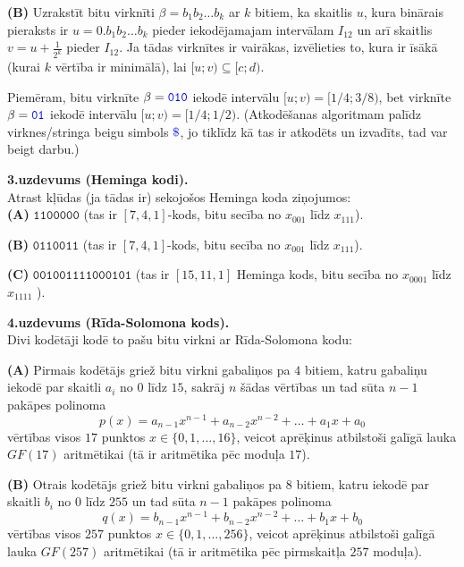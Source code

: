 \documentclass[a4paper]{article}
\begin{document}
\vspace{5pt}
{\bf (B)} Uzrakstīt bitu virknīti $\beta = b_1b_2\ldots{}b_k$ ar $k$ bitiem, ka 
skaitlis $u$, kura binārais pieraksts ir $u = 0.b_1b_2\ldots{}b_k$ pieder iekodējamajam intervālam 
$I_{12}$ un arī skaitlis $v = u + \frac{1}{2^k}$ pieder $I_{12}$. Ja tādas virknītes ir 
vairākas, izvēlieties to, kura ir īsākā (kurai $k$ vērtība ir minimālā), lai $[u;v) \subseteq [c;d)$. 

\vspace{5pt}
Piemēram, bitu virknīte $\beta = \textcolor{blue}{\mathtt{010}}$ iekodē intervālu $[u;v) = [1/4;3/8)$, 
bet virknīte $\beta = \textcolor{blue}{\mathtt{01}}$ iekodē intervālu $[u;v) = [1/4; 1/2)$. 
(Atkodēšanas algoritmam palīdz virknes/stringa beigu simbols $\textcolor{blue}{\mathtt{\$}}$, jo 
tiklīdz kā tas ir atkodēts un izvadīts, tad var beigt darbu.)


\vspace{20pt}
{\bf 3.uzdevums (Heminga kodi).}\\
Atrast kļūdas (ja tādas ir) sekojošos Heminga koda ziņojumos:\\
{\bf (A)} $\mathtt{1100000}$ (tas ir $[7,4,1]$-kods, bitu secība no $x_{001}$ līdz $x_{111}$). 

\vspace{5pt}
{\bf (B)} $\mathtt{0110011}$ (tas ir $[7,4,1]$-kods, bitu secība no $x_{001}$ līdz $x_{111}$). 

\vspace{5pt}
{\bf (C)} $\mathtt{001001111000101}$ (tas ir $[15,11,1]$ Heminga kods, bitu secība \textendash{} no $x_{0001}$ līdz
$x_{1111}$ ).



\vspace{20pt}
{\bf 4.uzdevums (Rīda-Solomona kods).}\\
Divi kodētāji kodē to pašu bitu virkni ar Rīda-Solomona kodu:

\vspace{5pt}
{\bf (A)} Pirmais kodētājs griež bitu virkni 
gabaliņos pa $4$ bitiem, katru gabaliņu iekodē par skaitli $a_i$ no $0$ līdz $15$, sakrāj $n$ šādas vērtības 
un tad sūta $n-1$ pakāpes polinoma 
$$p(x) = a_{n-1}x^{n-1} + a_{n-2}x^{n-2} + \ldots + a_1x + a_0$$
vērtības visos $17$ punktos $x \in \{ 0,1,\ldots,16 \}$, veicot aprēķinus atbilstoši galīgā lauka $GF(17)$ 
aritmētikai (tā ir aritmētika pēc moduļa $17$).

\vspace{5pt}
{\bf (B)} Otrais kodētājs griež bitu virkni gabaliņos pa $8$ bitiem, katru iekodē par skaitli $b_i$ no $0$ līdz $255$ 
un tad sūta $n-1$ pakāpes polinoma 
$$q(x) = b_{n-1}x^{n-1} + b_{n-2}x^{n-2} + \ldots + b_1x + b_0$$
vērtības visos $257$ punktos $x \in \{ 0,1,\ldots,256 \}$, vei\-cot aprēķinus atbilstoši galīgā lauka $GF(257)$ 
aritmētikai (tā ir aritmētika pēc pirmskaitļa $257$ moduļa). 
\end{document}
